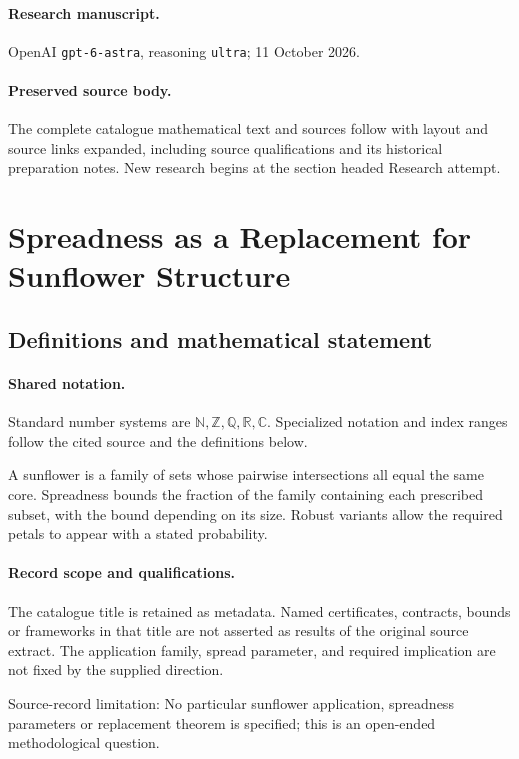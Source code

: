 \documentclass[11pt]{article}
\begin{document}
\paragraph{Research manuscript.} OpenAI \texttt{gpt-6-astra}, reasoning \texttt{ultra}; 11 October 2026.
\paragraph{Preserved source body.} The complete catalogue mathematical text and sources follow with layout and source links expanded, including source qualifications and its historical preparation notes. New research begins at the section headed Research attempt.

\section{Spreadness as a Replacement for Sunflower Structure}\label{statement}

\subsection{Definitions and mathematical statement}

\paragraph{Shared notation.}Standard number systems are $\mathbb N,\mathbb Z,\mathbb Q,\mathbb R,\mathbb C$. Specialized notation and index ranges follow the cited source and the definitions below.


A sunflower is a family of sets whose pairwise intersections all equal the same core. Spreadness bounds the fraction of the family containing each prescribed subset, with the bound depending on its size. Robust variants allow the required petals to appear with a stated probability.
\paragraph{Record scope and qualifications.}
The catalogue title is retained as metadata. Named certificates, contracts, bounds or frameworks in that title are not asserted as results of the original source extract.
The application family, spread parameter, and required implication are not fixed by the supplied direction.

Source-record limitation: No particular sunflower application, spreadness parameters or replacement theorem is specified; this is an open-ended methodological question.
\end{document}
